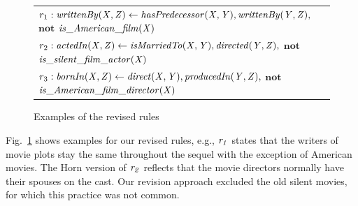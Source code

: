 %
%
%
%



\begin{figure}[tb]
    \centering
   
    \vspace{-.5cm}
    \begin{tabular}{l}
 {\scriptsize
        $r_1:  \mathit{writtenBy(X, Z)}  \leftarrow
        \mathit{hasPredecessor(X, Y)},\mathit{writtenBy(Y, Z)},$ $ \textbf{not}$  $\mathit{is\_American\_film(X)} $}\\        
       {\scriptsize 
$r_2:  \mathit{actedIn(X, Z)}  \leftarrow
        \mathit{isMarriedTo(X, Y)},\mathit{directed(Y, Z)},$ $ \textbf{not}$  $\mathit{is\_silent\_film\_actor(X)} $} \\
       {\scriptsize
                        $r_3:  \mathit{bornIn(X, Z)}  \leftarrow
        \mathit{direct(X, Y)},\mathit{producedIn(Y, Z)},$ $ \textbf{not}$ $\mathit{is\_American\_film\_director(X)}$     } \\
 \end{tabular}            
    \caption{Examples of the revised rules}
 \label{fig:examplerules}
 \vspace{-.4cm}
\end{figure}




Fig.~\ref{fig:examplerules} shows examples for our revised rules, e.g., $\mathit{r_1}$ states that the writers of movie plots stay the same throughout the sequel with the exception of American movies. %
The Horn version of $\mathit{r_2}$ reflects that the movie directors normally have their spouses on the cast. Our revision approach excluded the old silent movies, for which this practice was not common.










